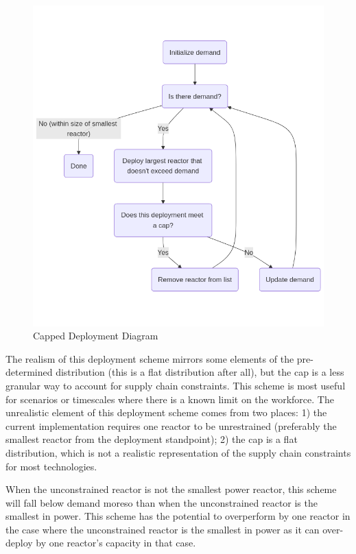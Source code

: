 \begin{figure}[!htbp]
    \centering
    \includegraphics[scale=0.4]{images/schemes/cap_diagram.png}
    \caption{Capped Deployment Diagram}
    \label{fig:cap_diagram}
\end{figure}

The realism of this deployment scheme mirrors some elements of the
pre-determined distribution (this is a flat distribution after all), but the
cap is a less granular way to account for supply chain constraints. This scheme
is most useful for scenarios or timescales where there is a known limit on the
workforce. The unrealistic element of this deployment scheme comes from two
places: 1) the current implementation requires one reactor to be unrestrained
(preferably the smallest reactor from the deployment standpoint); 2) the cap is
a flat distribution, which is not a realistic representation of the supply
chain constraints for most technologies.

When the unconstrained reactor is not the smallest power reactor, this scheme
will fall below demand moreso than when the unconstrained reactor is the
smallest in power. This scheme has the potential to overperform by one reactor
in the case where the unconstrained reactor is the smallest in power as it can
over-deploy by one reactor's capacity in that case.

